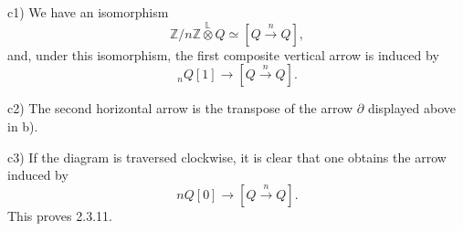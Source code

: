 \smallskip
\noindent c1) We have an isomorphism
\[
 \mathbb Z/n\mathbb Z
 \mathbin{\overset{\mathbb L}{\otimes}}Q
 \simeq[Q\xrightarrow{n}Q],
\]
and, under this isomorphism, the first composite vertical arrow is
induced by
\[
 {}_nQ[1]\longrightarrow[Q\xrightarrow{n}Q].
\]

\smallskip
\noindent c2) The second horizontal arrow is the transpose of the
arrow $\partial$ displayed above in b).

\smallskip
\noindent c3) If the diagram is traversed clockwise, it is clear that
one obtains the arrow induced by
\[
 nQ[0]\longrightarrow[Q\xrightarrow{n}Q].
\]
This proves 2.3.11.
